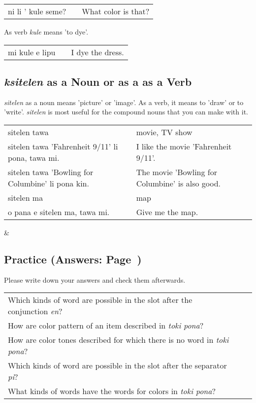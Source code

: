 \begin{supertabular}{p{5,5cm}|ll}
ni li ' kule seme? && What color is that? \\
\end{supertabular} 

As verb \textit{kule} means 'to dye'. 

\begin{supertabular}{p{5,5cm}|ll}
mi kule e lipu && I dye the dress. \\
\end{supertabular} 
%
\newpage

\subsection*{\textit{ksitelen} as a Noun or as a as a Verb}
%
%
\textit{sitelen}  as a noun means 'picture' or 'image'. 
As a verb, it means to 'draw' or to 'write'. 
\textit{sitelen} is most useful for the compound nouns that you can make with it. 

\begin{supertabular}{p{5,5cm}|ll}
sitelen tawa  && movie, TV show \\
sitelen tawa 'Fahrenheit 9/11' li pona, tawa mi. && I like the movie 'Fahrenheit 9/11'. \\
sitelen tawa 'Bowling for Columbine' li pona kin. && The movie 'Bowling for Columbine' is also good. \\
sitelen ma && map \\
o pana e sitelen ma, tawa mi. && Give me the map. \\
\end{supertabular} 
%
\newpage{}
&
\subsection*{Practice (Answers: Page~\pageref{'colors'})}
%
Please write down your answers and check them afterwards. 

\begin{supertabular}{p{5,5cm}|ll}
Which kinds of word are possible in the slot after the conjunction \textit{en}? &&  \\ %
How are color pattern of an item described in \textit{toki pona}? &&  \\ %
How are color tones described for which there is no word in \textit{toki pona}? &&  \\ %
Which kinds of word are possible in the slot after the separator \textit{pi}? &&   \\ %
What kinds of words have the words for colors in \textit{toki pona}? &&  \\ %
\end{supertabular} 

